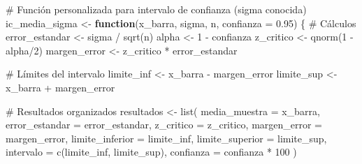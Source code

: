 \documentclass[
  spanish,
  letterpaper,
]{book}
\newenvironment{Shaded}{\begin{snugshade}}{\end{snugshade}}
\newcommand{\AttributeTok}[1]{\textcolor[rgb]{0.40,0.45,0.13}{#1}}
\newcommand{\CommentTok}[1]{\textcolor[rgb]{0.37,0.37,0.37}{#1}}
\newcommand{\ControlFlowTok}[1]{\textcolor[rgb]{0.00,0.23,0.31}{\textbf{#1}}}
\newcommand{\DecValTok}[1]{\textcolor[rgb]{0.68,0.00,0.00}{#1}}
\newcommand{\FloatTok}[1]{\textcolor[rgb]{0.68,0.00,0.00}{#1}}
\newcommand{\FunctionTok}[1]{\textcolor[rgb]{0.28,0.35,0.67}{#1}}
\newcommand{\NormalTok}[1]{\textcolor[rgb]{0.00,0.23,0.31}{#1}}
\newcommand{\OtherTok}[1]{\textcolor[rgb]{0.00,0.23,0.31}{#1}}
\newcommand{\SpecialCharTok}[1]{\textcolor[rgb]{0.37,0.37,0.37}{#1}}
\begin{document}
\begin{Shaded}
\begin{Highlighting}[]
\CommentTok{\# Función personalizada para intervalo de confianza (sigma conocida)}
\NormalTok{ic\_media\_sigma }\OtherTok{\textless{}{-}} \ControlFlowTok{function}\NormalTok{(x\_barra, sigma, n, }\AttributeTok{confianza =} \FloatTok{0.95}\NormalTok{) \{}
  \CommentTok{\# Cálculos}
\NormalTok{  error\_estandar }\OtherTok{\textless{}{-}}\NormalTok{ sigma }\SpecialCharTok{/} \FunctionTok{sqrt}\NormalTok{(n)}
\NormalTok{  alpha }\OtherTok{\textless{}{-}} \DecValTok{1} \SpecialCharTok{{-}}\NormalTok{ confianza}
\NormalTok{  z\_critico }\OtherTok{\textless{}{-}} \FunctionTok{qnorm}\NormalTok{(}\DecValTok{1} \SpecialCharTok{{-}}\NormalTok{ alpha}\SpecialCharTok{/}\DecValTok{2}\NormalTok{)}
\NormalTok{  margen\_error }\OtherTok{\textless{}{-}}\NormalTok{ z\_critico }\SpecialCharTok{*}\NormalTok{ error\_estandar}
  
  \CommentTok{\# Límites del intervalo}
\NormalTok{  limite\_inf }\OtherTok{\textless{}{-}}\NormalTok{ x\_barra }\SpecialCharTok{{-}}\NormalTok{ margen\_error}
\NormalTok{  limite\_sup }\OtherTok{\textless{}{-}}\NormalTok{ x\_barra }\SpecialCharTok{+}\NormalTok{ margen\_error}
  
  \CommentTok{\# Resultados organizados}
\NormalTok{  resultados }\OtherTok{\textless{}{-}} \FunctionTok{list}\NormalTok{(}
    \AttributeTok{media\_muestra =}\NormalTok{ x\_barra,}
    \AttributeTok{error\_estandar =}\NormalTok{ error\_estandar,}
    \AttributeTok{z\_critico =}\NormalTok{ z\_critico,}
    \AttributeTok{margen\_error =}\NormalTok{ margen\_error,}
    \AttributeTok{limite\_inferior =}\NormalTok{ limite\_inf,}
    \AttributeTok{limite\_superior =}\NormalTok{ limite\_sup,}
    \AttributeTok{intervalo =} \FunctionTok{c}\NormalTok{(limite\_inf, limite\_sup),}
    \AttributeTok{confianza =}\NormalTok{ confianza }\SpecialCharTok{*} \DecValTok{100}
\NormalTok{  )}
  

\end{Highlighting}
\end{Shaded}
\end{document}
